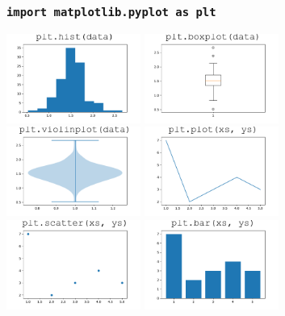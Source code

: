 \documentclass{beamer}
\begin{document}
\begin{frame}
\frametitle{\texttt{import matplotlib.pyplot as plt}}
\begin{center}
\includegraphics[width=0.33\textwidth]{../hist.pdf}
\includegraphics[width=0.33\textwidth]{../box.pdf}
\includegraphics[width=0.33\textwidth]{../violin.pdf}\newline
\vspace{7mm}
\includegraphics[width=0.33\textwidth]{../line.pdf}
\includegraphics[width=0.33\textwidth]{../scatter.pdf}
\includegraphics[width=0.33\textwidth]{../bar.pdf}
\end{center}
\end{frame}
\end{document}
